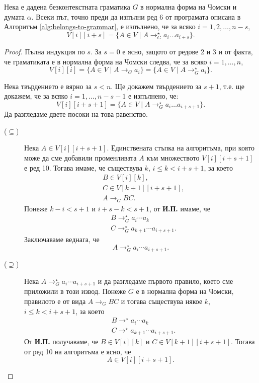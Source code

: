 \begin{lemma}
  Нека е дадена безконтекстната граматика $G$ в нормална форма на Чомски и думата $\alpha$.
  Всеки път, точно преди да изпълни ред 6 от програмата описана в Алгоритъм \ref{alg:belongs-to-grammar},
  е изпълнено, че за всяко $i = 1,2,\dots,n-s$,
  \[V[i][i+s] = \{A \in V \mid A \rightarrow^\star_G a_i\dots a_{i+s}\}.\]
\end{lemma}
\begin{proof}
  Пълна индукция по $s$.
  За $s = 0$ е ясно, защото от редове 2 и 3 и от факта, че граматиката е в нормална форма на Чомски следва, че за всяко $i = 1, \dots, n$,
  \[V[i][i] = \{A \in V \mid A \to_G a_i\} = \{A \in V \mid A \to^\star_G a_i\}.\]

  Нека твърдението е вярно за $s < n$. Ще докажем твърдението за $s+1$, т.е. ще докажем, че за всяко $i = 1,\dots,n-s-1$
  е изпълнено, че:
  \[V[i][i+s+1] = \{A \in V \mid A \rightarrow^\star_G a_i\dots a_{i+s+1}\}.\]
  Да разгледаме двете посоки на това равенство.
  \begin{description}
  \item[($\subseteq$)]
    Нека $A \in V[i][i+s+1]$.
    Единствената стъпка на алгоритъма, при която може да сме добавили променливата $A$ към множеството $V[i][i+s+1]$ е ред 10.
    Тогава имаме, че съществува $k$, $i \leq k < i+s+1$, за което
    \begin{align*}
      & B \in V[i][k],\\
      & C \in V[k+1][i+s+1],\\
      & A\to_G BC.
    \end{align*}
    Понеже $k-i < s+1$ и $i + s - k < s+1$, от {\bf И.П.} имаме, че
    \begin{align*}
      & B \to^\star_G a_i\cdots a_k\\
      & C \to^\star_G a_{k+1}\cdots a_{i+s+1}.
    \end{align*}
    Заключаваме веднага, че 
    \[A \to^\star_G a_i\cdots a_{i+s+1}.\]
  \item[($\supseteq$)]
    Нека $A \to^\star_G a_i\cdots a_{i+s+1}$ и да разгледаме първото правило, което сме приложили в този извод.
    Понеже $G$ е в нормална форма на Чомски, правилото е от вида $A \to_G BC$ и тогава съществува някое $k$, $i \leq k < i+s+1$, за което
    \begin{align*}
      & B \to^\star a_i\cdots a_{k}\\
      & C \to^\star a_{k+1}\cdots a_{i+s+1}.
    \end{align*}
    От {\bf И.П.} получаваме, че $B \in V[i][k]$ и $C \in V[k+1][i+s+1]$.
    Тогава от ред 10 на алгоритъма е ясно, че 
    \[A \in V[i][i+s+1].\]
  \end{description}
\end{proof}


